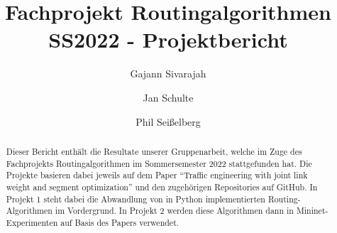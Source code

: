 




\title{Fachprojekt Routingalgorithmen SS2022 - Projektbericht}


\author{Gajann Sivarajah}
\author{Jan Schulte}
\author{Phil Seißelberg}



\begin{abstract}
  Dieser Bericht enthält die Resultate unserer Gruppenarbeit, welche im Zuge des 
  Fachprojekts Routingalgorithmen im Sommersemester 2022 stattgefunden hat. 
  Die Projekte basieren dabei jeweils auf dem Paper ``Traffic engineering with joint link
  weight and segment optimization'' \cite[1]{BasePaper} und den zugehörigen Repositories auf GitHub.
  In Projekt 1 steht dabei die Abwandlung von in Python implementierten Routing-Algorithmen
  im Vordergrund. In Projekt 2 werden diese Algorithmen dann in Mininet-Experimenten auf Basis
  des Papers verwendet.
  \end{abstract}

